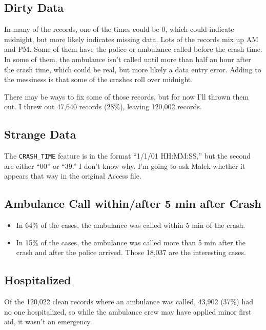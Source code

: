 \subsection{Dirty Data}


In many of the records, one of the times could be 0, which could indicate midnight, but more likely indicates missing data.  Lots of the records mix up AM and PM.  Some of them have the police or ambulance called before the crash time.  In some of them, the ambulance isn't called until more than half an hour after the crash time, which could be real, but more likely a data entry error.  Adding to the messiness is that some of the crashes roll over midnight.  

There may be ways to fix some of those records, but for now I'll thrown them out.  I threw out 47,640 records (28\%), leaving 120,002 records.  

\subsection{Strange Data}

The \verb|CRASH_TIME| feature is in the format ``1/1/01 HH:MM:SS,'' but the second are either ``00'' or ``39.''  I don't know why.  I'm going to ask Malek whether it appears that way in the original Access file.  

\subsection{Ambulance Call within/after 5 min after Crash}

\begin{itemize}
	\item In 64\% of the cases, the ambulance was called within 5 min of the crash.  
	\item In 15\% of the cases, the ambulance was called more than 5 min after the crash and after the police arrived.  Those 18,037 are the interesting cases.  
\end{itemize}

\subsection{Hospitalized}

Of the 120,022 clean records where an ambulance was called, 43,902 (37\%) had no one hospitalized, so while the ambulance crew may have applied minor first aid, it wasn't an emergency.  



